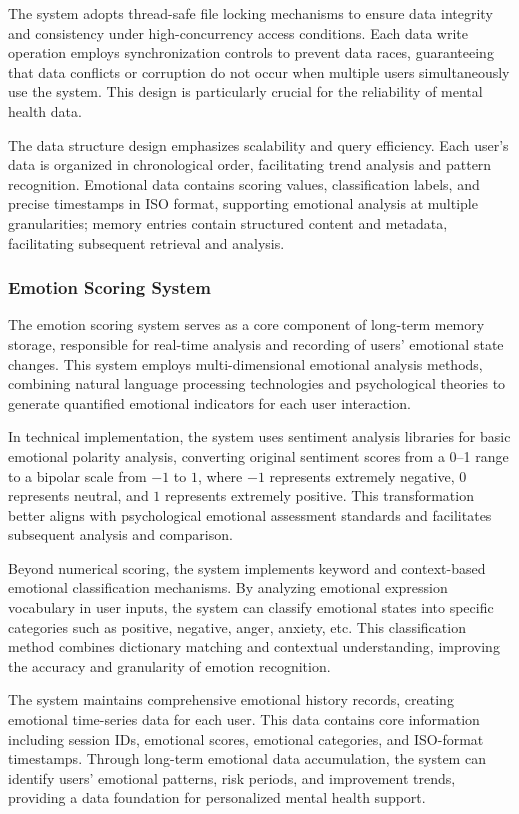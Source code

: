 The system adopts thread-safe file locking mechanisms to ensure data integrity and consistency under high-concurrency access conditions. Each data write operation employs synchronization controls to prevent data races, guaranteeing that data conflicts or corruption do not occur when multiple users simultaneously use the system. This design is particularly crucial for the reliability of mental health data.

The data structure design emphasizes scalability and query efficiency. Each user's data is organized in chronological order, facilitating trend analysis and pattern recognition. Emotional data contains scoring values, classification labels, and precise timestamps in ISO format, supporting emotional analysis at multiple granularities; memory entries contain structured content and metadata, facilitating subsequent retrieval and analysis.

\subsubsection{Emotion Scoring System}

The emotion scoring system serves as a core component of long-term memory storage, responsible for real-time analysis and recording of users' emotional state changes. This system employs multi-dimensional emotional analysis methods, combining natural language processing technologies and psychological theories to generate quantified emotional indicators for each user interaction.

In technical implementation, the system uses sentiment analysis libraries for basic emotional polarity analysis, converting original sentiment scores from a 0--1 range to a bipolar scale from $-1$ to $1$, where $-1$ represents extremely negative, $0$ represents neutral, and $1$ represents extremely positive. This transformation better aligns with psychological emotional assessment standards and facilitates subsequent analysis and comparison.

Beyond numerical scoring, the system implements keyword and context-based emotional classification mechanisms. By analyzing emotional expression vocabulary in user inputs, the system can classify emotional states into specific categories such as positive, negative, anger, anxiety, etc. This classification method combines dictionary matching and contextual understanding, improving the accuracy and granularity of emotion recognition.

The system maintains comprehensive emotional history records, creating emotional time-series data for each user. This data contains core information including session IDs, emotional scores, emotional categories, and ISO-format timestamps. Through long-term emotional data accumulation, the system can identify users' emotional patterns, risk periods, and improvement trends, providing a data foundation for personalized mental health support.

